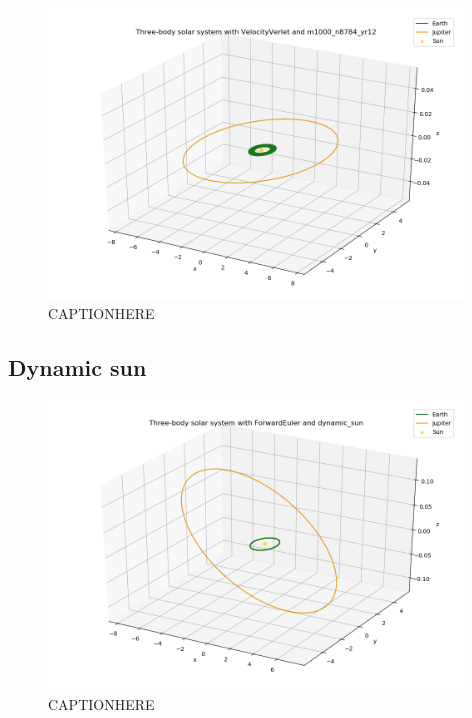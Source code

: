 \documentclass{article}
\begin{document}
    \begin{figure}[H]
        \centering
        \includegraphics[width = 11cm]{img/plot3D_S_E_J_V_m1000_n8784_yr12.png}
        \caption{CAPTIONHERE}
        \label{fig:plot3D_S_E_J_V_m1000_n8784_yr12}
    \end{figure}

\subsection{Dynamic sun}

    \begin{figure}[H]
        \centering
        \includegraphics[width = 11cm]{img/plot3D_S_E_J_F_dynamic_sun.png}
        \caption{CAPTIONHERE}
        \label{fig:plot3D_S_E_J_F_dynamic_sun}
    \end{figure}
\end{document}
